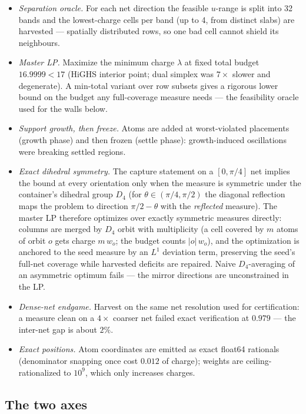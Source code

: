\documentclass[11pt]{article}
\theoremstyle{definition}
\theoremstyle{remark}
\begin{document}
\begin{itemize}
\item \emph{Separation oracle.} For each net direction the feasible
$u$-range is split into 32 bands and the lowest-charge cells per band
(up to 4, from distinct slabs) are harvested --- spatially distributed
rows, so one bad cell cannot shield its neighbours.
\item \emph{Master LP.} Maximize the minimum charge $\lambda$ at fixed
total budget $16.9999<17$ (HiGHS interior point; dual simplex was
$7\times$ slower and degenerate). A min-total variant over row subsets
gives a rigorous lower bound on the budget any full-coverage measure
needs --- the feasibility oracle used for the walls below.
\item \emph{Support growth, then freeze.} Atoms are added at
worst-violated placements (growth phase) and then frozen (settle phase):
growth-induced oscillations were breaking settled regions.
\item \emph{Exact dihedral symmetry.} The capture statement on a
$[0,\pi/4]$ net implies the bound at every orientation only when the
measure is symmetric under the container's dihedral group $D_4$ (for
$\theta\in(\pi/4,\pi/2)$ the diagonal reflection maps the problem to
direction $\pi/2-\theta$ with the \emph{reflected} measure). The master
LP therefore optimizes over exactly symmetric measures directly: columns
are merged by $D_4$ orbit with multiplicity (a cell covered by $m$
atoms of orbit $o$ gets charge $m\,w_o$; the budget counts $|o|\,w_o$),
and the optimization is anchored to the seed measure by an $L^1$
deviation term, preserving the seed's full-net coverage while harvested
deficits are repaired. Naive $D_4$-averaging of an asymmetric optimum
fails --- the mirror directions are unconstrained in the LP.
\item \emph{Dense-net endgame.} Harvest on the same net resolution used
for certification: a measure clean on a $4\times$ coarser net failed
exact verification at $0.979$ --- the inter-net gap is about $2\%$.
\item \emph{Exact positions.} Atom coordinates are emitted as exact
float64 rationals (denominator snapping once cost $0.012$ of charge);
weights are ceiling-rationalized to $10^9$, which only increases
charges.
\end{itemize}

\subsection{The two axes}
\end{document}
